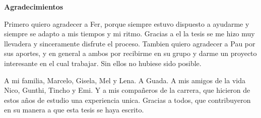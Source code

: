 \newenvironment{agradecimientos}%
{\thispagestyle{empty} \cleardoublepage\null \thispagestyle{empty} \vfill\begin{center}%
\textbf{Agradecimientos} \end{center}}%
{\thispagestyle{empty} \vfill\null }

\begin{agradecimientos}
Primero quiero agradecer a Fer, porque siempre estuvo dispuesto a ayudarme y siempre se adapto a mis tiempos y mi ritmo. Gracias a el la tesis se me hizo muy llevadera y sinceramente disfrute el proceso. Tambien quiero agradecer a Pau por sus aportes, y en general a ambos por recibirme en su grupo y darme un proyecto interesante en el cual trabajar. Sin ellos no hubiese sido posible.

A mi familia, Marcelo, Gisela, Mel y Lena.
A Guada.
A mis amigos de la vida Nico, Gunthi, Tincho y Emi.
Y a mis compañeros de la carrera, que hicieron de estos años de estudio una experiencia unica.
Gracias a todos, que contribuyeron en su manera a que esta tesis se haya escrito.



\end{agradecimientos}
%
%
% 
\null